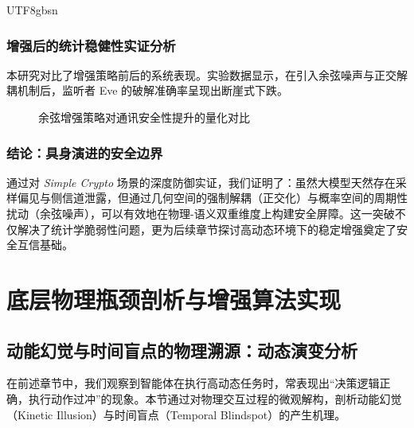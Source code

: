 \documentclass[11pt,a4paper]{article}
\begin{document}
\begin{CJK*}{UTF8}{gbsn}
\subsubsection{增强后的统计稳健性实证分析}
本研究对比了增强策略前后的系统表现。实验数据显示，在引入余弦噪声与正交解耦机制后，监听者 Eve 的破解准确率呈现出断崖式下跌。

\begin{figure}[h!]
\centering
{}
\caption{余弦增强策略对通讯安全性提升的量化对比}
\end{figure}



\subsubsection{结论：具身演进的安全边界}
通过对 \textit{Simple Crypto} 场景的深度防御实证，我们证明了：虽然大模型天然存在采样偏见与侧信道泄露，但通过几何空间的强制解耦（正交化）与概率空间的周期性扰动（余弦噪声），可以有效地在物理-语义双重维度上构建安全屏障。这一突破不仅解决了统计学脆弱性问题，更为后续章节探讨高动态环境下的稳定增强奠定了安全互信基础。

\newpage

\section{底层物理瓶颈剖析与增强算法实现}

\subsection{动能幻觉与时间盲点的物理溯源：动态演变分析}
在前述章节中，我们观察到智能体在执行高动态任务时，常表现出“决策逻辑正确，执行动作过冲”的现象。本节通过对物理交互过程的微观解构，剖析动能幻觉（Kinetic Illusion）与时间盲点（Temporal Blindspot）的产生机理。


\end{CJK*}
\end{document}
